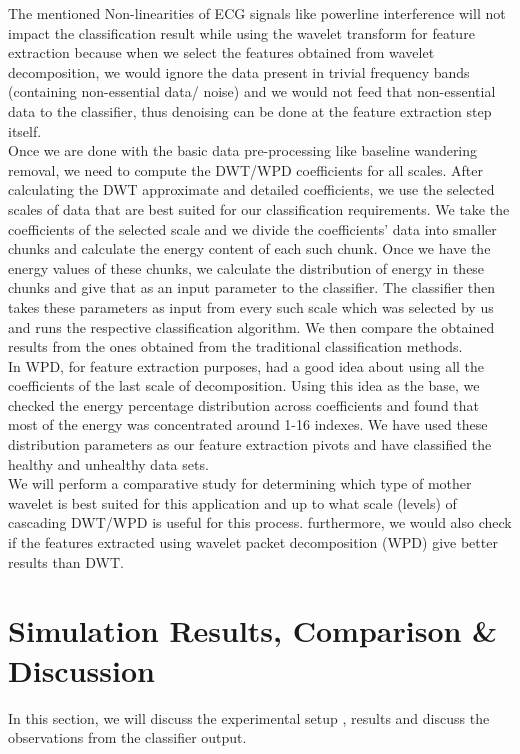 \documentclass[10pt,twocolumn,letterpaper]{article}
\begin{document}
The mentioned Non-linearities of ECG signals like powerline interference will not impact the classification result while using the wavelet transform for feature extraction because when we select the features obtained from wavelet decomposition, we would ignore the data present in trivial frequency bands (containing non-essential data/ noise) and we would not feed that non-essential data to the classifier, thus denoising can be done at the feature extraction step itself.\\ 
Once we are done with the basic data pre-processing like baseline wandering removal, we need to compute the DWT/WPD coefficients for all scales. After calculating the DWT approximate and detailed coefficients, we use the selected scales of data that are best suited for our classification requirements. We take the coefficients of the selected scale and we divide the coefficients’ data into smaller chunks and calculate the energy content of each such chunk. Once we have the energy values of these chunks, we calculate the distribution of energy in these chunks and give that as an input parameter to the classifier. The classifier then takes these parameters as input from every such scale which was selected by us and runs the respective classification algorithm. We then compare the obtained results from the ones obtained from the traditional classification methods.\\
In WPD, for feature extraction purposes, \cite{Alpher01} had a good idea about using all the coefficients of the last scale of decomposition. Using this idea as the base, we checked the energy percentage distribution across coefficients and found that most of the energy was concentrated around 1-16 indexes. We have used these distribution parameters as our feature extraction pivots and have classified the healthy and unhealthy data sets.\\
We will perform a comparative study for determining which type of mother wavelet is best suited for this application and up to what scale (levels) of cascading DWT/WPD is useful for this process. furthermore, we would also check if the features extracted using wavelet packet decomposition (WPD) give better results than DWT.

\section{Simulation Results, Comparison \& Discussion}
In this section, we will discuss the experimental setup , results and discuss the observations from the classifier output.
\end{document}
